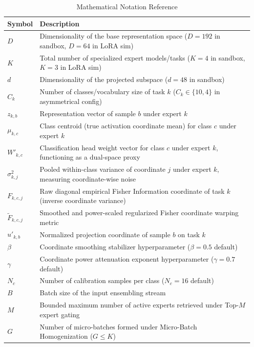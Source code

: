 \begin{table}[h]
\caption{Mathematical Notation Reference}
\label{tab:notation_reference}
\begin{center}
\begin{small}
\begin{tabular}{ll}
\toprule
\textbf{Symbol} & \textbf{Description} \\
\midrule
$D$ & Dimensionality of the base representation space ($D=192$ in sandbox, $D=64$ in LoRA sim) \\
$K$ & Total number of specialized expert models/tasks ($K=4$ in sandbox, $K=3$ in LoRA sim) \\
$d$ & Dimensionality of the projected subspace ($d=48$ in sandbox) \\
$C_k$ & Number of classes/vocabulary size of task $k$ ($C_k \in \{10, 4\}$ in asymmetrical config) \\
$z_{k, b}$ & Representation vector of sample $b$ under expert $k$ \\
$\mu_{k, c}$ & Class centroid (true activation coordinate mean) for class $c$ under expert $k$ \\
$W'_{k, c}$ & Classification head weight vector for class $c$ under expert $k$, functioning as a dual-space proxy \\
$\sigma_{k, j}^2$ & Pooled within-class variance of coordinate $j$ under expert $k$, measuring coordinate-wise noise \\
$F_{k, c, j}$ & Raw diagonal empirical Fisher Information coordinate of task $k$ (inverse coordinate variance) \\
$\tilde{F}_{k, c, j}$ & Smoothed and power-scaled regularized Fisher coordinate warping metric \\
$u'_{k, b}$ & Normalized projection coordinate of sample $b$ on task $k$ \\
$\beta$ & Coordinate smoothing stabilizer hyperparameter ($\beta=0.5$ default) \\
$\gamma$ & Coordinate power attenuation exponent hyperparameter ($\gamma=0.7$ default) \\
$N_c$ & Number of calibration samples per class ($N_c=16$ default) \\
$B$ & Batch size of the input ensembling stream \\
$M$ & Bounded maximum number of active experts retrieved under Top-$M$ expert gating \\
$G$ & Number of micro-batches formed under Micro-Batch Homogenization ($G \le K$) \\
\bottomrule
\end{tabular}
\end{small}
\end{center}
\end{table}

